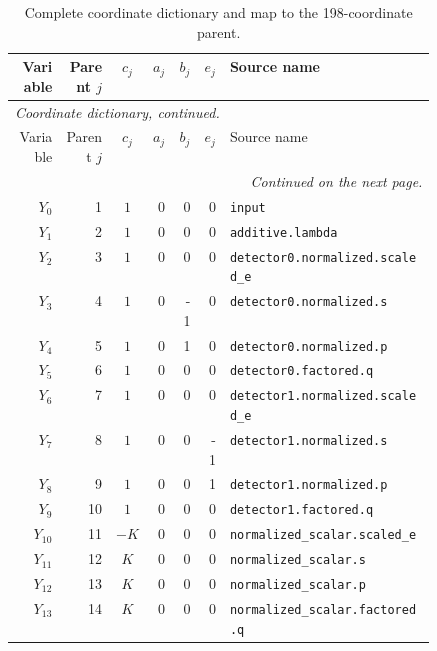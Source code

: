 {\small
\setlength{\tabcolsep}{3pt}
\begin{longtable}{@{}r r c r r r p{0.49\linewidth}@{}}
\caption{Complete coordinate dictionary and map to the 198-coordinate parent.}
\label{q196:coordinates}\\
\hline
Variable & Parent $j$ & $c_j$ & $a_j$ & $b_j$ & $e_j$ & Source name \\
\hline
\endfirsthead
\multicolumn{7}{l}{\emph{Coordinate dictionary, continued.}}\\
\hline
Variable & Parent $j$ & $c_j$ & $a_j$ & $b_j$ & $e_j$ & Source name \\
\hline
\endhead
\hline\multicolumn{7}{r}{\emph{Continued on the next page.}}\\
\endfoot
\hline
\endlastfoot
\(Y_{0}\) & 1 & \(1\) & 0 & 0 & 0 & \texttt{input} \\
\(Y_{1}\) & 2 & \(1\) & 0 & 0 & 0 & \texttt{additive.\allowbreak{}lambda} \\
\(Y_{2}\) & 3 & \(1\) & 0 & 0 & 0 & \texttt{detector0.\allowbreak{}normalized.\allowbreak{}scaled\_e} \\
\(Y_{3}\) & 4 & \(1\) & 0 & -1 & 0 & \texttt{detector0.\allowbreak{}normalized.\allowbreak{}s} \\
\(Y_{4}\) & 5 & \(1\) & 0 & 1 & 0 & \texttt{detector0.\allowbreak{}normalized.\allowbreak{}p} \\
\(Y_{5}\) & 6 & \(1\) & 0 & 0 & 0 & \texttt{detector0.\allowbreak{}factored.\allowbreak{}q} \\
\(Y_{6}\) & 7 & \(1\) & 0 & 0 & 0 & \texttt{detector1.\allowbreak{}normalized.\allowbreak{}scaled\_e} \\
\(Y_{7}\) & 8 & \(1\) & 0 & 0 & -1 & \texttt{detector1.\allowbreak{}normalized.\allowbreak{}s} \\
\(Y_{8}\) & 9 & \(1\) & 0 & 0 & 1 & \texttt{detector1.\allowbreak{}normalized.\allowbreak{}p} \\
\(Y_{9}\) & 10 & \(1\) & 0 & 0 & 0 & \texttt{detector1.\allowbreak{}factored.\allowbreak{}q} \\
\(Y_{10}\) & 11 & \(-K\) & 0 & 0 & 0 & \texttt{normalized\_scalar.\allowbreak{}scaled\_e} \\
\(Y_{11}\) & 12 & \(K\) & 0 & 0 & 0 & \texttt{normalized\_scalar.\allowbreak{}s} \\
\(Y_{12}\) & 13 & \(K\) & 0 & 0 & 0 & \texttt{normalized\_scalar.\allowbreak{}p} \\
\(Y_{13}\) & 14 & \(K\) & 0 & 0 & 0 & \texttt{normalized\_scalar.\allowbreak{}factored.\allowbreak{}q} \\

\end{longtable}}
